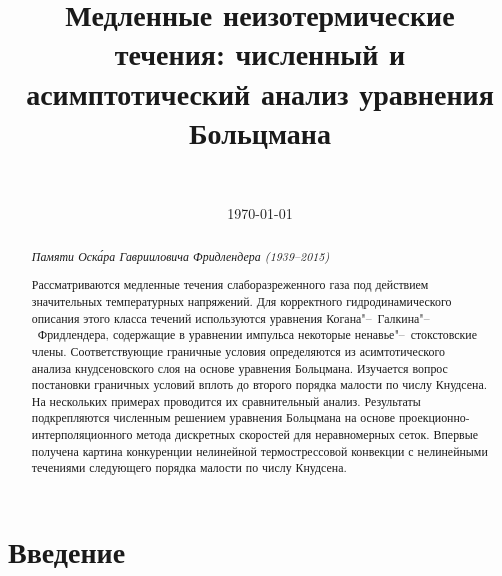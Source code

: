 \documentclass[
aps,%
12pt,%
final,%
notitlepage,%
oneside,%
onecolumn,%
nobibnotes,%
nofootinbib,%
superscriptaddress,%
noshowpacs,%
showkeys,%
floatfix,%
tightenlines,%
centertags]%
{revtex4}
\begin{document}

\title{Медленные неизотермические течения: численный и асимптотический анализ уравнения Больцмана}
\author{~}

\date{\today}

\begin{abstract}
    \begin{flushright}
    \vspace{1em}
    {\it Памяти Оск\'{а}ра Гаврииловича Фридлендера (1939--2015)}
    \vspace{1em}
    \end{flushright}
    Рассматриваются медленные течения слаборазреженного газа
    под действием значительных температурных напряжений.
    Для корректного гидродинамического описания этого класса течений
    используются уравнения Когана"--~Галкина"--~Фридлендера,
    содержащие в уравнении импульса некоторые ненавье"--~стокстовские члены.
    Соответствующие граничные условия определяются из
    асимтотического анализа кнудсеновского слоя на основе уравнения Больцмана.
    Изучается вопрос постановки граничных условий вплоть до второго порядка малости по числу Кнудсена.
    На нескольких примерах проводится их сравнительный анализ.
    Результаты подкрепляются численным решением уравнения Больцмана на основе
    проекционно-интерполяционного метода дискретных скоростей для неравномерных сеток.
    Впервые получена картина конкуренции нелинейной термострессовой конвекции с
    нелинейными течениями следующего порядка малости по числу Кнудсена.
\end{abstract}


\maketitle

\section{Введение}
\end{document}

